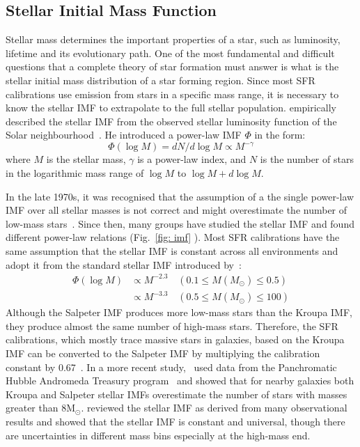 \subsection{Stellar Initial Mass Function}
\label{sec: imf}
Stellar mass determines the important properties of a star, such as luminosity, lifetime and its evolutionary path. 
One of the most fundamental and difficult questions that a complete theory of star formation must answer is what is the stellar initial mass distribution of a star forming region.
Since most SFR calibrations use emission from stars in a specific mass range, it is necessary to know the stellar IMF to extrapolate to the full stellar population.
\cite{Salpeter55} empirically described the stellar IMF from the observed stellar luminosity function of the Solar neighbourhood~\citep{Shu87}. 
He introduced a power-law IMF $\Phi$  in the form:
\begin{equation}
\label{equ: salp}
\Phi (\log M) = dN / d \log M \propto M^{-\gamma }
\end{equation} 
where $M$ is the stellar mass, $\gamma$ is a power-law index, and $N$ is the number of stars in the logarithmic mass range of $\log M$ to $\log M + d\log M$. 

In the late 1970s, it was recognised that the assumption of a the single power-law IMF over all stellar masses is not correct and might overestimate the number of low-mass stars~\citep{Kroupa93, Bastin10}. 
Since then, many groups have studied the stellar IMF and found different power-law relations (Fig.~\ref{fig: imf} ). 
Most SFR calibrations have the same assumption that the stellar IMF is constant across all environments and adopt it from the standard stellar IMF introduced by\ \cite{Kroupa01}:
\begin{equation}
\begin{split}
    \Phi (\log M) & \propto M^{-2.3}    \quad    (0.1 \le M(M_{\odot}) \le 0.5)\\                  
           & \propto M^{-3.3}    \quad    (0.5 \le M(M_{\odot}) \le 100)
\end{split}
\end{equation}
Although the Salpeter IMF produces more low-mass stars than the Kroupa IMF, they produce almost the same number of high-mass stars. 
Therefore, the SFR calibrations, which mostly trace massive stars in galaxies, based on the Kroupa IMF can be converted to the Salpeter IMF by multiplying the calibration constant by 0.67~\citep{Madau14}.
In a more recent study,~\cite{Weisz15} used data from the Panchromatic Hubble Andromeda Treasury program~\citep[PHAT][]{Dalcanton12} and showed that for nearby galaxies both Kroupa and Salpeter stellar IMFs overestimate the number of stars with masses greater than 8M$_\odot$.
\cite{Bastin10} reviewed the stellar IMF as derived from many observational results and showed that the stellar IMF is constant and universal, though there are uncertainties in different mass bins especially at the high-mass end. 

